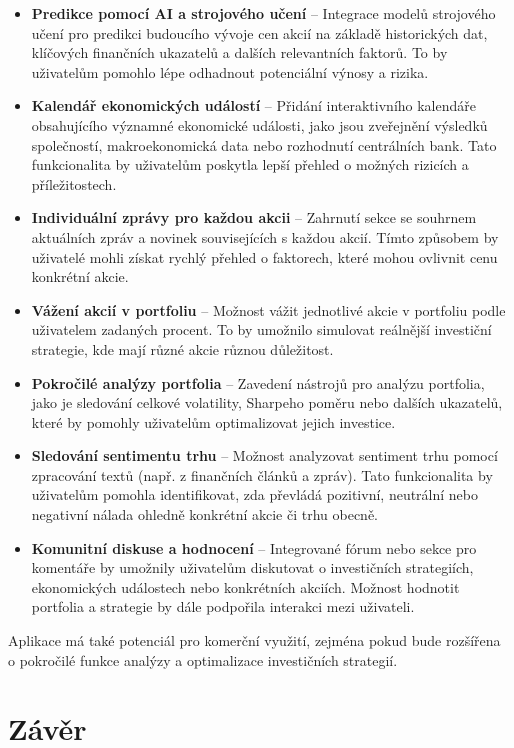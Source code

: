 \documentclass[12pt, a4paper]{report}
\begin{document}
\begin{itemize}
    \item \textbf{Predikce pomocí AI a strojového učení} – Integrace modelů strojového učení pro predikci budoucího vývoje cen akcií na základě historických dat, klíčových finančních ukazatelů a dalších relevantních faktorů. To by uživatelům pomohlo lépe odhadnout potenciální výnosy a rizika.
    \item \textbf{Kalendář ekonomických událostí} – Přidání interaktivního kalendáře obsahujícího významné ekonomické události, jako jsou zveřejnění výsledků společností, makroekonomická data nebo rozhodnutí centrálních bank. Tato funkcionalita by uživatelům poskytla lepší přehled o možných rizicích a příležitostech.
    \item \textbf{Individuální zprávy pro každou akcii} – Zahrnutí sekce se souhrnem aktuálních zpráv a novinek souvisejících s každou akcií. Tímto způsobem by uživatelé mohli získat rychlý přehled o faktorech, které mohou ovlivnit cenu konkrétní akcie.
    \item \textbf{Vážení akcií v portfoliu} – Možnost vážit jednotlivé akcie v portfoliu podle uživatelem zadaných procent. To by umožnilo simulovat reálnější investiční strategie, kde mají různé akcie různou důležitost.
    \item \textbf{Pokročilé analýzy portfolia} – Zavedení nástrojů pro analýzu portfolia, jako je sledování celkové volatility, Sharpeho poměru nebo dalších ukazatelů, které by pomohly uživatelům optimalizovat jejich investice.
    \item \textbf{Sledování sentimentu trhu} – Možnost analyzovat sentiment trhu pomocí zpracování textů (např. z finančních článků a zpráv). Tato funkcionalita by uživatelům pomohla identifikovat, zda převládá pozitivní, neutrální nebo negativní nálada ohledně konkrétní akcie či trhu obecně.
    \item \textbf{Komunitní diskuse a hodnocení} – Integrované fórum nebo sekce pro komentáře by umožnily uživatelům diskutovat o investičních strategiích, ekonomických událostech nebo konkrétních akciích. Možnost hodnotit portfolia a strategie by dále podpořila interakci mezi uživateli.
\end{itemize}

Aplikace má také potenciál pro komerční využití, zejména pokud bude rozšířena o pokročilé funkce analýzy a optimalizace investičních strategií.

\section{Závěr}
\end{document}
